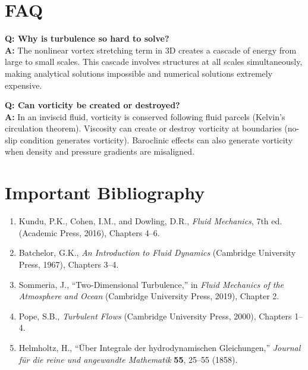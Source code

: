 \section*{FAQ}

\textbf{Q: Why is turbulence so hard to solve?}\\
\textbf{A:} The nonlinear vortex stretching term in 3D creates a cascade of energy from large to small scales. This cascade involves structures at all scales simultaneously, making analytical solutions impossible and numerical solutions extremely expensive.

\textbf{Q: Can vorticity be created or destroyed?}\\
\textbf{A:} In an inviscid fluid, vorticity is conserved following fluid parcels (Kelvin's circulation theorem). Viscosity can create or destroy vorticity at boundaries (no-slip condition generates vorticity). Baroclinic effects can also generate vorticity when density and pressure gradients are misaligned.
\section*{Important Bibliography}

\begin{enumerate}
\item Kundu, P.K., Cohen, I.M., and Dowling, D.R., \textit{Fluid Mechanics}, 7th ed. (Academic Press, 2016), Chapters 4--6.
\item Batchelor, G.K., \textit{An Introduction to Fluid Dynamics} (Cambridge University Press, 1967), Chapters 3--4.
\item Sommeria, J., ``Two-Dimensional Turbulence,'' in \textit{Fluid Mechanics of the Atmosphere and Ocean} (Cambridge University Press, 2019), Chapter 2.
\item Pope, S.B., \textit{Turbulent Flows} (Cambridge University Press, 2000), Chapters 1--4.
\item Helmholtz, H., ``\"Uber Integrale der hydrodynamischen Gleichungen,'' \textit{Journal f\"ur die reine und angewandte Mathematik} \textbf{55}, 25--55 (1858).
\end{enumerate}


